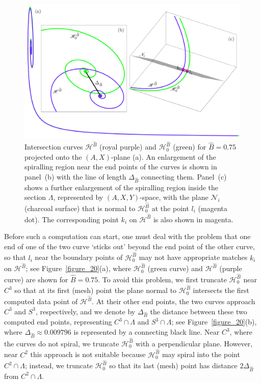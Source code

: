 \documentclass{ws-ijbc}
\begin{document}
\begin{figure}[t!]
\centering
\includegraphics[]{./figures/MKMO_21.pdf}
\caption{Intersection curves $\mathscr{H}^{\widehat{B}}$ (royal purple) and $\mathscr{H}_0^{\widehat{B}}$ (green) for $\widehat{B}=0.75$ projected onto the $(A,X)$-plane (a).  An enlargement of the spiralling region near the end points of the curves is shown in panel~(b) with the line of length $\Delta_{\widehat{B}}$ connecting them.  Panel~(c) shows a further enlargement of the spiralling region inside the section $\Lambda$, represented by  $(A,X,Y)$-space, with the plane $\mathscr{N}_i$ (charcoal surface) that is normal to $\mathscr{H}_0^{\widehat{B}}$ at the point $l_i$ (magenta dot).  The corresponding point $k_i$ on $\mathscr{H}^{\widehat{B}}$ is also shown in magenta.}
\label{figure_21}
\end{figure}

Before such a computation can start, one must deal with the problem that one end of one of the two curve `sticks out' beyond the end point of the other curve, so that $l_i$ near the boundary points of $\mathscr{H}_0^{\widehat{B}}$ may not have appropriate matches $k_i$ on $\mathscr{H}^{\widehat{B}}$; see Figure~\ref{figure_20}(a), where $\mathscr{H}_0^{\widehat{B}}$ (green curve) and $\mathscr{H}^{\widehat{B}}$ (purple curve) are shown for $\widehat{B}=0.75$. To avoid this problem, we first truncate $\mathscr{H}_0^{\widehat{B}}$ near $C^3$ so that at its first (mesh) point the plane normal to $\mathscr{H}_0^{\widehat{B}}$ intersects the first computed data point of $\mathscr{H}^{\widehat{B}}$.  At their other end points, the two curves approach $C^3$ and $S^3$, respectively, and we denote by $\Delta_{\widehat{B}}$ the distance between these two computed end points, representing $C^3 \cap \Lambda$ and $S^3 \cap \Lambda$; see Figure~\ref{figure_20}(b), where $\Delta_{\widehat{B}} \approx 0.009796$ is represented by a connecting black line. Near $C^3$, where the curves do not spiral, we truncate $\mathscr{H}_0^{\widehat{B}}$ with a perpendicular plane. However, near $C^2$ this approach is not suitable because $\mathscr{H}_0^{\widehat{B}}$ may spiral into the point $C^2 \cap \Lambda$; instead, we truncate $\mathscr{H}_0^{\widehat{B}}$ so that its last (mesh) point has distance $2\Delta_{\widehat{B}}$ from $C^2 \cap \Lambda$.
\end{document}
